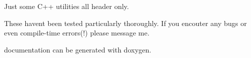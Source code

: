 Just some C++ utilities all header only.

These haven\textquotesingle{}t been tested particularly thoroughly. If you encouter any bugs or even compile-\/time errors(!) please message me.

documentation can be generated with doxygen. 